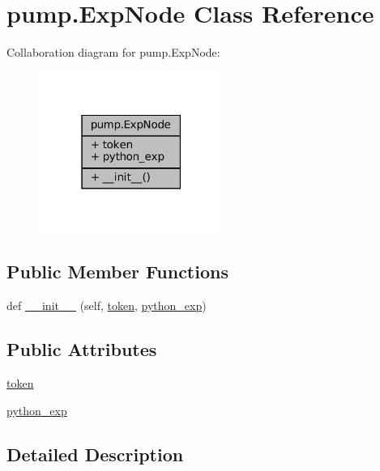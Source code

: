 \hypertarget{classpump_1_1ExpNode}{}\section{pump.\+Exp\+Node Class Reference}
\label{classpump_1_1ExpNode}


Collaboration diagram for pump.\+Exp\+Node\+:
\nopagebreak
\begin{figure}[H]
\begin{center}
\leavevmode
\includegraphics[width=171pt]{classpump_1_1ExpNode__coll__graph}
\end{center}
\end{figure}
\subsection*{Public Member Functions}
\begin{DoxyCompactItemize}
\item 
def \hyperlink{classpump_1_1ExpNode_a0808c394c4d3c8ac875005caa1b3e1b3}{\+\_\+\+\_\+init\+\_\+\+\_\+} (self, \hyperlink{classpump_1_1ExpNode_ade05a5a32535d717dc5c194569aaf356}{token}, \hyperlink{classpump_1_1ExpNode_adccfe4778c2e34f6b2c88118c0f1587f}{python\+\_\+exp})
\end{DoxyCompactItemize}
\subsection*{Public Attributes}
\begin{DoxyCompactItemize}
\item 
\hyperlink{classpump_1_1ExpNode_ade05a5a32535d717dc5c194569aaf356}{token}
\item 
\hyperlink{classpump_1_1ExpNode_adccfe4778c2e34f6b2c88118c0f1587f}{python\+\_\+exp}
\end{DoxyCompactItemize}


\subsection{Detailed Description}


